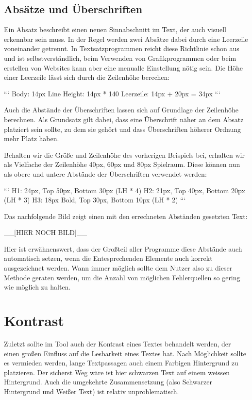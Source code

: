 \subsection{Absätze und Überschriften}
Ein Absatz beschreibt einen neuen Sinnabschnitt im Text, der auch visuell erkennbar sein muss. In der Regel werden zwei Absätze dabei durch eine Leerzeile voneinander getrennt. In Textsatzprogrammen reicht diese Richtlinie schon aus und ist selbstverständlich, beim Verwenden von Grafikprogrammen oder beim erstellen von Websites kann aber eine menualle Einstellung nötig sein. Die Höhe einer Leerzeile lässt sich durch die Zeilenhöhe berechen:

```
Body: 14px
Line Height: 14px * 140%
Leerzeile: 14px + 20px = 34px
```

Auch die Abstände der Überschriften lassen sich auf Grundlage der Zeilenhöhe berechnen. Als Grundsatz gilt dabei, dass eine Überschrift näher an dem Absatz platziert sein sollte, zu dem sie gehört und dass Überschriften höherer Ordnung mehr Platz haben.

Behalten wir die Größe und Zeilenhöhe des vorherigen Beispiels bei, erhalten wir als Vielfache der Zeilenhöhe 40px, 60px und 80px Spielraum. Diese können nun als obere und untere Abstände der Überschriften verwendet werden:

```
H1: 24px, Top 50px, Bottom 30px (LH * 4)
H2: 21px, Top 40px, Bottom 20px (LH * 3)
H3: 18px Bold, Top 30px, Bottom 10px (LH * 2)
```

Das nachfolgende Bild zeigt einen mit den errechneten Abständen gesetzten Text:

__[HIER NOCH BILD]__

Hier ist erwähnenswert, dass der Großteil aller Programme diese Abstände auch automatisch setzen, wenn die Entesprechenden Elemente auch korrekt ausgezeichnet werden. Wann immer möglich sollte dem Nutzer also zu dieser Methode geraten werden, um die Anzahl von möglichen Fehlerquellen so gering wie möglich zu halten.



\section{Kontrast}
Zuletzt sollte im Tool auch der Kontrast eines Textes behandelt werden, der einen großen Einfluss auf die Lesbarkeit eines Textes hat.
Nach Möglichkeit sollte es vermieden werden, lange Textpassagen auch einem Farbigen Hintergrund zu platzieren.
Der sicherst Weg wäre ist hier schwarzen Text auf einem weissen Hintergrund. Auch die umgekehrte Zusammensetzung (also Schwarzer Hintergrund und Weißer Text) ist relativ unproblematisch.

